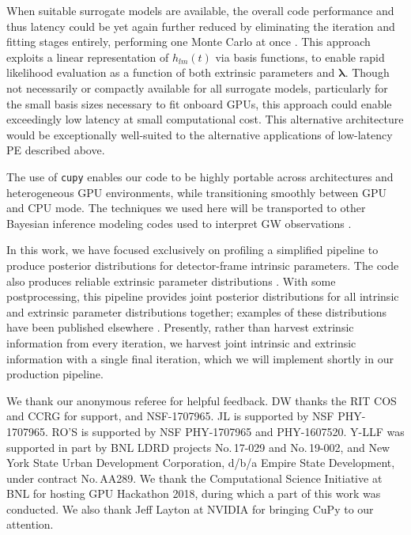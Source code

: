 \documentclass[twocolumn,prd,nofootinbib]{revtex4}
\newcommand\AddedResponse[1]{{\color{blue} {#1}}}
\begin{document}
When suitable surrogate models are available, the overall code performance and thus latency could be yet again further
reduced by eliminating the iteration and fitting stages entirely, performing one Monte Carlo at once
\cite{gwastro-PE-AlternativeArchitecturesROM}.  This approach exploits a linear representation of  $h_{lm}(t)$  via
basis functions, to enable rapid likelihood evaluation as a function of both extrinsic parameters and  $\bm{\lambda}$.
Though not necessarily or compactly available for all surrogate models, particularly for the small basis sizes necessary
to fit onboard GPUs, this approach could enable exceedingly low latency at small computational cost.  This alternative
architecture would be exceptionally well-suited to the alternative applications of low-latency PE described above. 

The use of \texttt{cupy} enables our code to be highly portable across architectures and heterogeneous GPU environments,
while transitioning smoothly between GPU and CPU mode.     The techniques we used here will be transported to other
Bayesian inference modeling codes used to interpret GW observations \cite{gwastro-PopulationReconstruct-Parametric-Wysocki2018,gwastro-PopulationReconstruct-Code-PopModels}.


\AddedResponse{In this work, we have focused exclusively on profiling a simplified pipeline  to produce posterior distributions
  for detector-frame intrinsic parameters.   The  code  also produces
reliable extrinsic parameter distributions \cite{gwastro-PE-AlternativeArchitectures}.  With some postprocessing,
this pipeline  provides joint posterior distributions for all intrinsic and extrinsic parameter distributions together;
examples of these distributions have been published elsewhere \cite{LIGO-O2-Catalog}.  
Presently, rather than harvest extrinsic information from every iteration, we harvest joint intrinsic and
extrinsic information with a single final iteration, which we will implement shortly in our production pipeline.
}




\begin{acknowledgements}
We thank our anonymous referee for helpful feedback.
DW thanks the RIT COS and CCRG for support, and  NSF-1707965.
JL is supported by NSF PHY-1707965.  
RO'S is supported by NSF PHY-1707965 and PHY-1607520.
Y-LLF was supported in part by BNL LDRD projects No.\,17-029 and No.\,19-002, 
and New York State Urban Development Corporation, d/b/a Empire State Development, under contract No.\,AA289.
We thank the Computational Science Initiative at BNL for hosting GPU Hackathon 2018, during which a part of this work was conducted. We also thank Jeff Layton at NVIDIA for bringing CuPy to our attention.
\end{acknowledgements}
\end{document}
